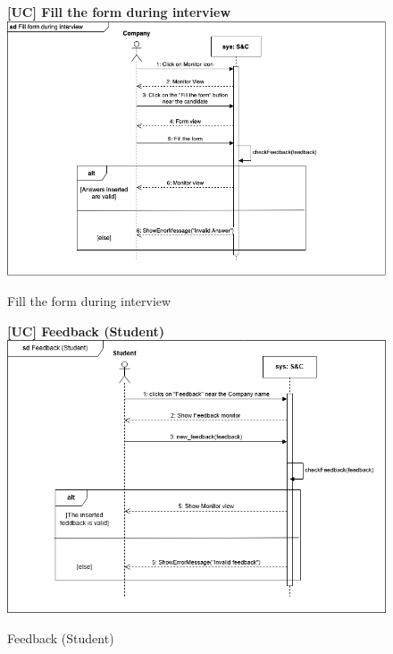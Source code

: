 \begin{figure}[H]
\textbf{[UC\nextUCDiagr] Fill the form during interview}\newline\newline
    \includegraphics[width=15cm]{Images/UC_diagram/RASD-UC_FillInterviewForm.png}
    \caption{Fill the form during interview}
\end{figure}

\begin{figure}[H]
\textbf{[UC\nextUCDiagr] Feedback (Student)}\newline\newline
    \includegraphics[width=15cm]{Images/UC_diagram/RASD-UC26.drawio.png}
    \caption{Feedback (Student)}
\end{figure}

